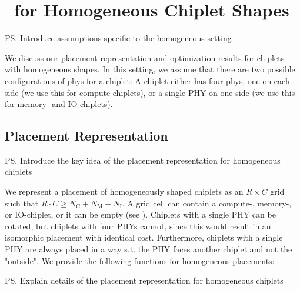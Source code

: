 \section{\name~for Homogeneous Chiplet Shapes}
\label{sec:homo}

\ps{Introduce assumptions specific to the homogeneous setting}

We discuss our placement representation and optimization results for chiplets with homogeneous shapes.
In this setting, we assume that there are two possible configurations of \gls{phys} for a chiplet:
A chiplet either has four \gls{phys}, one on each side (we use this for compute-chiplets), or a single PHY on one side (we use this for memory- and IO-chiplets).

\subsection{Placement Representation}
\label{ssec:homo-repr}

\ps{Introduce the key idea of the placement representation for homogeneous chiplets}

We represent a placement of homogeneously shaped chiplets as an $R \times C$ grid such that $R \cdot C \geq N_\text{C} + N_\text{M} + N_\text{I}$.
A grid cell can contain a compute-, memory-,  or IO-chiplet, or it can be empty (see ).
Chiplets with a single PHY can be rotated, but chiplets with four PHYs cannot, since this would result in an isomorphic placement with identical cost.
Furthermore, chiplets with a single PHY are always placed in a way s.t. the PHY faces another chiplet and not the "outside".
We provide the following functions for homogeneous placements:

\ps{Explain details of the placement representation for homogeneous chiplets}

